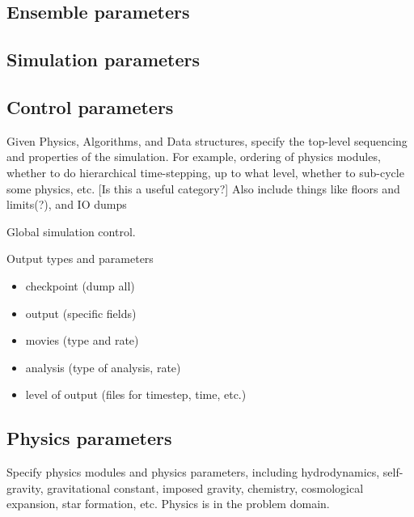 \subsection{Ensemble parameters}
\subsection{Simulation parameters}

\subsection{Control parameters} \label{ss:params-control}

Given Physics, Algorithms, and Data structures, specify the top-level
sequencing and properties of the simulation.  For example, ordering of
physics modules, whether to do hierarchical time-stepping, up to what
level, whether to sub-cycle some physics, etc. [Is this a useful
category?]  Also include things like floors and limits(?), and IO
dumps

Global simulation control.

Output types and parameters

\begin{itemize}
\item checkpoint (dump all)
\item output (specific fields)
\item movies (type and rate)
\item analysis (type of analysis, rate)
\item level of output (files for timestep, time, etc.)
\end{itemize}

\subsection{Physics parameters} \label{ss:params-physics}

Specify physics modules and physics parameters, including
hydrodynamics, self-gravity, gravitational constant, imposed gravity,
chemistry, cosmological expansion, star formation, etc.  Physics is in
the problem domain.

